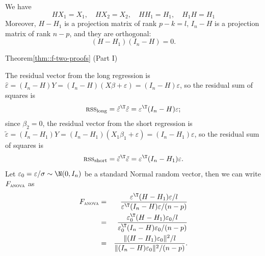 \begin{lemma}\label{lemma::projection-m-F}
We have
$$
HX_{1}=X_{1}, \quad HX_2 = X_2, \quad  HH_{1} =H_{1},\quad H_{1}H=H_{1}
$$
Moreover, 
$H-H_{1}$ is a projection matrix of rank $p-k=l$, 
$I_{n}-H$ is a projection matrix of rank $n-p$, and they are orthogonal:
\begin{equation}
(H-H_{1})(I_{n}-H)=0.\label{eq:basic4}
\end{equation}
\end{lemma}

\begin{myproof}{Theorem}{\ref{thm::f-two-proofs} (Part I)}

The residual vector from the long regression is $\hat{\varepsilon}=(I_{n}-H)Y=(I_{n}-H)(X\beta+\varepsilon)=(I_{n}-H)\varepsilon$,
so the residual sum of squares is 
\[
\textsc{rss}_{\text{long}}=\hat{\varepsilon}^{\T}\hat{\varepsilon}=\varepsilon^{\T}(I_{n}-H)\varepsilon;
\]
since $\beta_{2}=0$, the residual vector from the short regression
is $\tilde{\varepsilon}=(I_{n}-H_{1})Y=(I_{n}-H_{1})(X_{1}\beta_{1}+\varepsilon)=(I_{n}-H_{1})\varepsilon$,
so the residual sum of squares is
\[
\textsc{rss}_{\text{short}}=\tilde{\varepsilon}^{\T}\tilde{\varepsilon}=\varepsilon^{\T}(I_{n}-H_{1})\varepsilon.
\]
Let $\varepsilon_{0}=\varepsilon/\sigma\sim\N(0,I_{n})$ be a standard
Normal random vector, then we can write $F_\textsc{anova} $ as
\begin{eqnarray}
F_\textsc{anova}  &=& \frac{\varepsilon^{\T}(H-H_{1})\varepsilon/l}{\varepsilon^{\T}(I_{n}-H)\varepsilon/(n-p)} \nonumber  \\
&=&\frac{\varepsilon_{0}^{\T}(H-H_{1})\varepsilon_{0}/l}{\varepsilon_{0}^{\T}(I_{n}-H)\varepsilon_{0}/(n-p)} \nonumber\\
&=&\frac{\|(H-H_{1})\varepsilon_{0}\|^{2}/l}{\|(I_{n}-H)\varepsilon_{0}\|^{2}/(n-p)}.\label{eq:FratioofQ}
\end{eqnarray}


\end{myproof}
